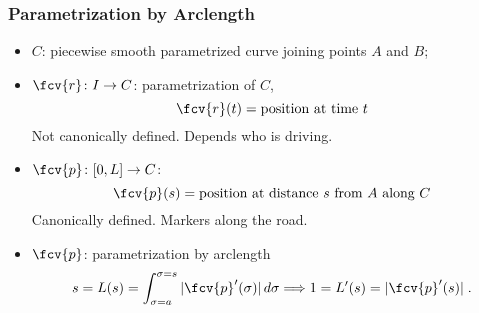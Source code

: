 \begin{frame}
  \frametitle{Parametrization by Arclength}

  \begin{itemize}
    \item $C$: piecewise smooth parametrized curve joining points $A$ and $B$;
    \item $\fcv{r} \colon I \to C$: parametrization of $C$,
    $$\fcv{r}(t) = \text{position at time }t$$
    Not canonically defined. Depends who is driving.
    \item $\fcv{p} \colon [0,L] \to C$:
    $$\fcv{p}(s) = \text{position at distance } s \text{ from }A \text{ along } C$$
    Canonically defined. Markers along the road.
    \item $\fcv{p}$: parametrization by arclength
    $$s=L(s) = \int_{\sigma=a}^{\sigma=s} |\fcv{p}'(\sigma)| \, d\sigma \Longrightarrow 1 = L'(s) = |\fcv{p}'(s)|\; .$$

  \end{itemize}
\end{frame}